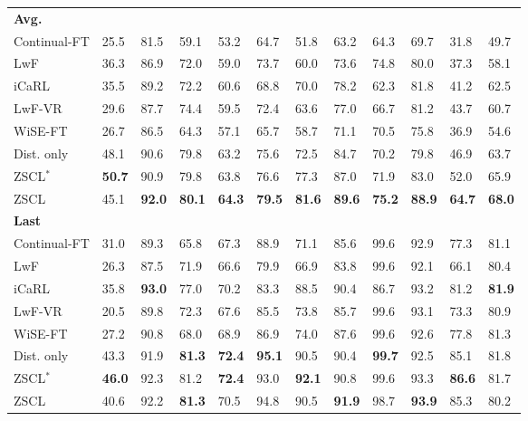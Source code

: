 \begin{table}[t]
{\begin{tabular}{y{120}*{11}{x{18}}}
\quad \textbf{Avg.} \\
\quad \quad Continual-FT & 25.5 & 81.5 & 59.1 & 53.2 & 64.7 & 51.8 & 63.2 & 64.3 & 69.7 & 31.8 & 49.7 \\
\quad \quad LwF~\cite{li2017learning} & 36.3 & 86.9 & 72.0 & 59.0 & 73.7 & 60.0 & 73.6 & 74.8 & 80.0 & 37.3 & 58.1 \\
\quad \quad iCaRL~\cite{rebuffi2017icarl} & 35.5 & 89.2 & 72.2 & 60.6 & 68.8 & 70.0 & 78.2 & 62.3 & 81.8 & 41.2 & 62.5 \\
\quad \quad LwF-VR~\cite{ding2022don} & 29.6 & 87.7 & 74.4 & 59.5 & 72.4 & 63.6 & 77.0 & 66.7 & 81.2 & 43.7 & 60.7 \\
\quad \quad WiSE-FT~\cite{wortsman2022robust} & 26.7 & 86.5 & 64.3 & 57.1 & 65.7 & 58.7 & 71.1 & 70.5 & 75.8 & 36.9 & 54.6 \\
\quad \quad Dist. only & 48.1 & 90.6 & 79.8 & 63.2 & 75.6 & 72.5 & 84.7 & 70.2 & 79.8 & 46.9 & 63.7 \\ 
\quad \quad ZSCL$^*$ & \textbf{50.7} & 90.9 & 79.8 & 63.8 & 76.6 & 77.3 & 87.0 & 71.9 & 83.0 & 52.0 & 65.9 \\
\quad \quad ZSCL & 45.1 & \textbf{92.0} & \textbf{80.1} & \textbf{64.3} & \textbf{79.5} & \textbf{81.6} & \textbf{89.6} & \textbf{75.2} & \textbf{88.9} & \textbf{64.7} & \textbf{68.0} \\ \midrule

\quad \textbf{Last} \\
\quad \quad Continual-FT & 31.0 & 89.3 & 65.8 & 67.3 & 88.9 & 71.1 & 85.6 & 99.6 & 92.9 & 77.3 & 81.1 \\
\quad \quad LwF~\cite{li2017learning} & 26.3 & 87.5 & 71.9 & 66.6 & 79.9 & 66.9 & 83.8 & 99.6 & 92.1 & 66.1 & 80.4 \\
\quad \quad iCaRL~\cite{rebuffi2017icarl} & 35.8 & \textbf{93.0} & 77.0 & 70.2 & 83.3 & 88.5 & 90.4 & 86.7 & 93.2 & 81.2 & \textbf{81.9} \\
\quad \quad LwF-VR~\cite{ding2022don} & 20.5 & 89.8 & 72.3 & 67.6 & 85.5 & 73.8 & 85.7 & 99.6 & 93.1 & 73.3 & 80.9 \\
\quad \quad WiSE-FT~\cite{wortsman2022robust} & 27.2 & 90.8 & 68.0 & 68.9 & 86.9 & 74.0 & 87.6 & 99.6 & 92.6 & 77.8 & 81.3 \\
\quad \quad Dist. only & 43.3 & 91.9 & \textbf{81.3} & \textbf{72.4} & \textbf{95.1} & 90.5 & 90.4 & \textbf{99.7} & 92.5 & 85.1 & 81.8 \\ 
\quad \quad ZSCL$^*$ & \textbf{46.0} & 92.3 & 81.2 & \textbf{72.4} & 93.0 & \textbf{92.1} & 90.8 & 99.6 & 93.3 & \textbf{86.6} & 81.7 \\
\quad \quad ZSCL & 40.6 & 92.2 & \textbf{81.3} & 70.5 & 94.8 & 90.5 & \textbf{91.9} & 98.7 & \textbf{93.9} & 85.3 & 80.2 \\
\bottomrule
\end{tabular}%
}
\end{table}


